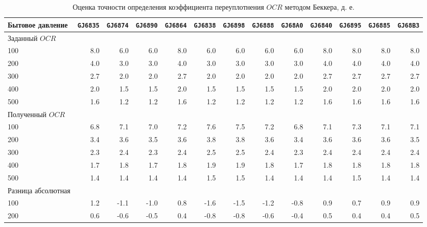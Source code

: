 \begin{sidewaystable}[p]
    \centering
    \small
    \caption{Оценка точности определения коэффициента переуплотнения $OCR$ методом Беккера, д. е.} \label{tab:ocr-beck}
    \begin{tabular}{@{}lrrrrrrrrrrrr@{}}
    \toprule
    Бытовое давление & \texttt{GJ6835} & \texttt{GJ6874} & \texttt{GJ6890} & \texttt{GJ6864} & \texttt{GJ6838} & \texttt{GJ6898} & \texttt{GJ6888} & \texttt{GJ68A0} & \texttt{GJ6840} & \texttt{GJ6895} & \texttt{GJ6885} & \texttt{GJ68B3} \\
    \midrule
    Заданный $OCR$ &  &  &  &  &  &  &  &  &  &  &  &  \\
    100 & 8.0 & 6.0 & 6.0 & 8.0 & 6.0 & 6.0 & 6.0 & 6.0 & 8.0 & 8.0 & 8.0 & 8.0 \\
    200 & 4.0 & 3.0 & 3.0 & 4.0 & 3.0 & 3.0 & 3.0 & 3.0 & 4.0 & 4.0 & 4.0 & 4.0 \\
    300 & 2.7 & 2.0 & 2.0 & 2.7 & 2.0 & 2.0 & 2.0 & 2.0 & 2.7 & 2.7 & 2.7 & 2.7 \\
    400 & 2.0 & 1.5 & 1.5 & 2.0 & 1.5 & 1.5 & 1.5 & 1.5 & 2.0 & 2.0 & 2.0 & 2.0 \\
    500 & 1.6 & 1.2 & 1.2 & 1.6 & 1.2 & 1.2 & 1.2 & 1.2 & 1.6 & 1.6 & 1.6 & 1.6 \\
    \midrule
    Полученный $OCR$ &  &  &  &  &  &  &  &  &  &  &  &  \\
    100 & 6.8 & 7.1 & 7.0 & 7.2 & 7.6 & 7.5 & 7.2 & 6.8 & 7.1 & 7.3 & 7.1 & 7.1 \\
    200 & 3.4 & 3.6 & 3.5 & 3.6 & 3.8 & 3.8 & 3.6 & 3.4 & 3.6 & 3.6 & 3.6 & 3.5 \\
    300 & 2.3 & 2.4 & 2.3 & 2.4 & 2.5 & 2.5 & 2.4 & 2.3 & 2.4 & 2.4 & 2.4 & 2.4 \\
    400 & 1.7 & 1.8 & 1.7 & 1.8 & 1.9 & 1.9 & 1.8 & 1.7 & 1.8 & 1.8 & 1.8 & 1.8 \\
    500 & 1.4 & 1.4 & 1.4 & 1.4 & 1.5 & 1.5 & 1.4 & 1.4 & 1.4 & 1.5 & 1.4 & 1.4 \\
    \midrule
    Разница абсолютная &  &  &  &  &  &  &  &  &  &  &  &  \\
    100 & 1.2 & -1.1 & -1.0 & 0.8 & -1.6 & -1.5 & -1.2 & -0.8 & 0.9 & 0.7 & 0.9 & 0.9 \\
    200 & 0.6 & -0.6 & -0.5 & 0.4 & -0.8 & -0.8 & -0.6 & -0.4 & 0.5 & 0.4 & 0.4 & 0.5 \\

\end{tabular}
\end{sidewaystable}
